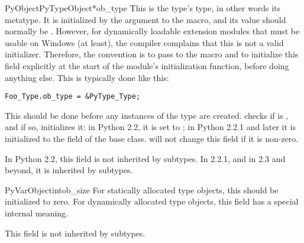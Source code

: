 \begin{cmemberdesc}{PyObject}{PyTypeObject*}{ob_type}
  This is the type's type, in other words its metatype.  It is
  initialized by the argument to the  macro,
  and its value should normally be .  However, for
  dynamically loadable extension modules that must be usable on
  Windows (at least), the compiler complains that this is not a valid
  initializer.  Therefore, the convention is to pass \NULL{} to the
   macro and to initialize this field
  explicitly at the start of the module's initialization function,
  before doing anything else.  This is typically done like this:

\begin{verbatim}
Foo_Type.ob_type = &PyType_Type;
\end{verbatim}

  This should be done before any instances of the type are created.
   checks if  is \NULL, and
  if so, initializes it: in Python 2.2, it is set to
  ; in Python 2.2.1 and later it is
  initialized to the  field of the base class.
   will not change this field if it is
  non-zero.

  In Python 2.2, this field is not inherited by subtypes.  In 2.2.1,
  and in 2.3 and beyond, it is inherited by subtypes.
\end{cmemberdesc}

\begin{cmemberdesc}{PyVarObject}{int}{ob_size}
  For statically allocated type objects, this should be initialized
  to zero.  For dynamically allocated type objects, this field has a
  special internal meaning.

  This field is not inherited by subtypes.
\end{cmemberdesc}

